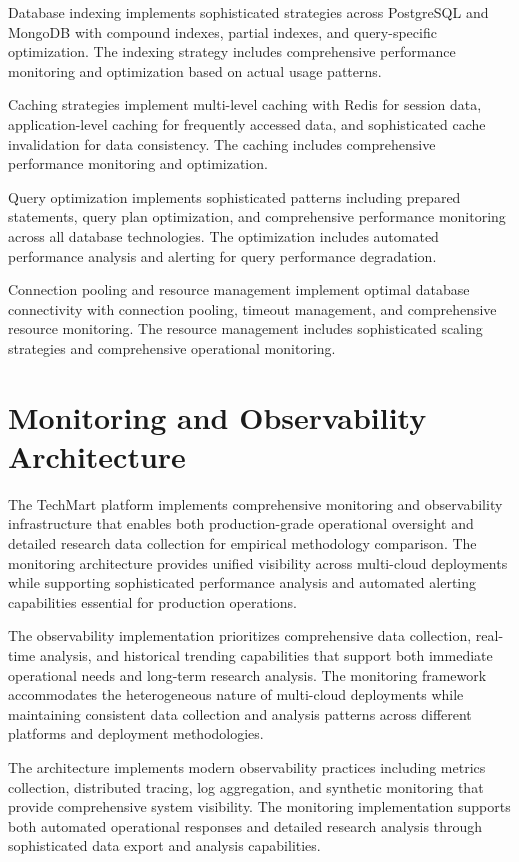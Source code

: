Database indexing implements sophisticated strategies across PostgreSQL and MongoDB with compound indexes, partial indexes, and query-specific optimization. The indexing strategy includes comprehensive performance monitoring and optimization based on actual usage patterns.

Caching strategies implement multi-level caching with Redis for session data, application-level caching for frequently accessed data, and sophisticated cache invalidation for data consistency. The caching includes comprehensive performance monitoring and optimization.

Query optimization implements sophisticated patterns including prepared statements, query plan optimization, and comprehensive performance monitoring across all database technologies. The optimization includes automated performance analysis and alerting for query performance degradation.

Connection pooling and resource management implement optimal database connectivity with connection pooling, timeout management, and comprehensive resource monitoring. The resource management includes sophisticated scaling strategies and comprehensive operational monitoring.



\section{Monitoring and Observability Architecture}

The TechMart platform implements comprehensive monitoring and observability infrastructure that enables both production-grade operational oversight and detailed research data collection for empirical methodology comparison. The monitoring architecture provides unified visibility across multi-cloud deployments while supporting sophisticated performance analysis and automated alerting capabilities essential for production operations.

The observability implementation prioritizes comprehensive data collection, real-time analysis, and historical trending capabilities that support both immediate operational needs and long-term research analysis. The monitoring framework accommodates the heterogeneous nature of multi-cloud deployments while maintaining consistent data collection and analysis patterns across different platforms and deployment methodologies.

The architecture implements modern observability practices including metrics collection, distributed tracing, log aggregation, and synthetic monitoring that provide comprehensive system visibility. The monitoring implementation supports both automated operational responses and detailed research analysis through sophisticated data export and analysis capabilities.

